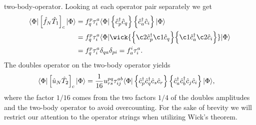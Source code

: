         two-body-operator.
        Looking at each operator pair separately we get
        \begin{align}
            \bra{\slat}\brak{
                \fock_N\clust_1
            }_c\ket{\slat}
            &=
            \fockten^{p}_{q}\clustamp^{a}_{i}
            \bra{\slat}\brac{
                \ccr{p}\can{q}
            }\brac{
                \ccr{a}
                \can{i}
            }\ket{\slat}
            \\
            &=
            \fockten^{p}_{q}\clustamp^{a}_{i}
            \bra{\slat}
            \wick{
                \Big\{
                    \c2 {\ccr{p}}
                    \c1 {\can{q}}
                \Big\}
                \Big\{
                    \c1 {\ccr{a}}
                    \c2 {\can{i}}
                \Big\}
            }
            \ket{\slat}
            \\
            &=
            \fockten^{p}_{q}\clustamp^{a}_{i}
            \delta_{qa}\delta_{pi}
            = \fockten^{i}_{a}\clustamp^{a}_{i}.
        \end{align}
        The doubles operator on the two-body operator yields
        \begin{align}
            \langle \Phi |\left[ 
                \hat{u}_N \hat{T}_2
             \right]_c
            | \Phi \rangle
            &=
            \frac{1}{16}u^{pq}_{rs}\tau^{ab}_{ij}
            \langle \Phi |
            \left\{ 
                \hat{c}_{p}^{\dagger}
                \hat{c}_{q}^{\dagger}
                \hat{c}_{s}
                \hat{c}_{r}
             \right\}
            \left\{ 
                \hat{c}_{a}^{\dagger}
                \hat{c}_{b}^{\dagger}
                \hat{c}_{j}
                \hat{c}_{i}
             \right\}
            | \Phi \rangle,
        \end{align}
        where the factor $1/16$ comes from the two factors $1/4$ of the doubles
        amplitudes and the two-body operator to avoid overcounting.
        For the sake of brevity we will restrict our attention to the operator
        strings when utilizing Wick's theorem.
